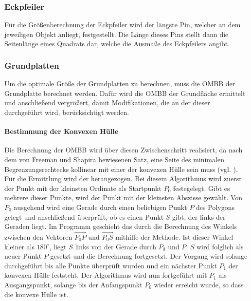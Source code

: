 \subsubsection{Eckpfeiler}
Für die Größenberechnung der Eckpfeiler wird der längste Pin, welcher an dem jeweiligen Objekt anliegt, festgestellt.
Die Länge dieses Pins stellt dann die Seitenlänge eines Quadrats dar, welche die Ausmaße des Eckpfeilers angibt.

\subsubsection{Grundplatten}
Um die optimale Größe der Grundplatten zu berechnen, muss die OMBB der Grundplatte berechnet werden.
Dafür wird die OMBB der Grundfläche ermittelt und anschließend vergrößert, damit Modifikationen, die an der dieser durchgeführt wird, berücksichtigt werden.

\paragraph{Bestimmung der Konvexen Hülle}
Die Berechnung der OMBB wird über diesen Zwischenschritt realisiert, da nach dem von Freeman und Shapira bewiesenen Satz, eine Seite des minimalen Begrenzungsrechtecks kollinear mit einer der konvexen Hülle sein muss (vgl. \cite{ombb}). \\
Für die Ermittlung wird der  herangezogen.
Bei diesem Algorithmus wird zuerst der Punkt mit der kleinsten Ordinate als Startpunkt $P_0$ festegelegt.
Gibt es mehrere dieser Punkte, wird der Punkt mit der kleinsten Abszisse gewählt.
Von $P_0$ ausgehend wird eine Gerade durch einen beliebigen Punkt $P$ des Polygons gelegt und anschließend überprüft, ob es einen Punkt $S$ gibt, der links der Geraden liegt.
Im Programm geschieht das durch die Berechnung des Winkels zwischen den Vektoren $\overrightarrow{{P_0}P}$ und $\overrightarrow{{P_0}S}$ mithilfe der  Methode.
Ist dieser Winkel kleiner als $180^\circ$, liegt $S$ links von der Gerade durch $P_0$ und $P$.
$S$ wird folglich als neuer Punkt $P$ gesetzt und die Berechnung fortgesetzt.
Der Vorgang wird solange durchgeführt bis alle Punkte überprüft wurden und ein nächster Punkt $P_1$ der konvexen Hülle feststeht.
Der Algorithmus wird nun fortgeführt mit $P_1$ als Ausgangspunkt, solange bis der Anfangspunkt $P_0$ wieder erreicht wurde, so dass die konvexe Hülle  ist.

